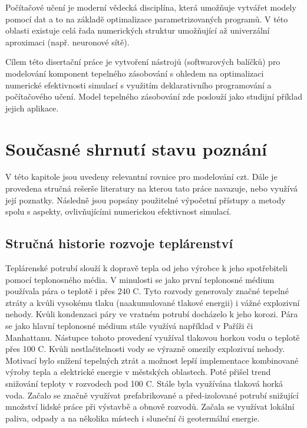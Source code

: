 Počítačové učení je moderní vědecká disciplína, která umožňuje vytvářet modely
pomocí dat a to na základě optimalizace parametrizovaných programů. V této
oblasti existuje celá řada numerických struktur umožňující až univerzální
aproximaci (např. neuronové sítě).

Cílem této disertační práce je vytvoření nástrojů (softwarových balíčků) pro
modelování komponent tepelného zásobování s ohledem na optimalizaci numerické
efektivnosti simulací s využitím deklarativního programování a počítačového
učení. Model tepelného zásobování zde poslouží jako studijní příklad jejich
aplikace.

\chapter{Současné shrnutí stavu poznání}
\label{struktura}
V této kapitole jsou uvedeny relevantní rovnice pro modelování \acrshort{czt}.
Dále je provedena stručná rešerše literatury na kterou tato práce navazuje,
nebo využívá její poznatky. Následně jsou popsány použitelné výpočetní přístupy
a metody spolu s aspekty, ovlivňujícími numerickou efektivnost simulací.

\section{Stručná historie rozvoje teplárenství}
\label{sec:history}
Teplárenské potrubí slouží k dopravě tepla od jeho výrobce k jeho spotřebiteli
pomocí teplonosného média. V minulosti se jako první teplonosné médium
používala pára o teplotě i přes 240 \degree C. Tyto rozvody generovaly značné
tepelné ztráty a kvůli vysokému tlaku (naakumulované tlakové energii) i vážné
explozivní nehody. Kvůli kondenzaci páry ve vratném potrubí docházelo k jeho
korozi. Pára se jako hlavní teplonosné médium stále využívá například v Paříži
či Manhattanu. Nástupce tohoto provedení využíval tlakovou horkou vodu o
teplotě přes 100 \degree C. Kvůli nestlačitelnosti vody se výrazně omezily
explozivní nehody.
Motivací bylo snížení tepelných ztrát a možnost lepší implementace kombinované
výroby tepla a elektrické energie v městských oblastech. Poté přišel trend
snižování teploty v rozvodech pod 100 \degree C. Stále byla využívána tlaková
horká voda. Začalo se značně využívat prefabrikované a před-izolované potrubí
snižující množství lidské práce při výstavbě a obnově rozvodů. Začala se
využívat lokální paliva, odpady a na několika místech i sluneční či geotermální
energie.

